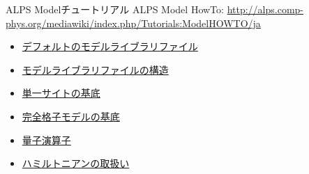 \begin{frame}{ALPS Modelチュートリアル}
  ALPS Model HowTo: {\footnotesize \url{http://alps.comp-phys.org/mediawiki/index.php/Tutorials:ModelHOWTO/ja}} \\
  \begin{itemize}
  \item \href{http://alps.comp-phys.org/mediawiki/index.php/Tutorials:ModelHOWTO/ja\#.E3.83.87.E3.83.95.E3.82.A9.E3.83.AB.E3.83.88.E3.81.AE.E3.83.A2.E3.83.87.E3.83.AB.E3.83.A9.E3.82.A4.E3.83.96.E3.83.A9.E3.83.AA.E3.83.95.E3.82.A1.E3.82.A4.E3.83.AB.E3.80.80}{デフォルトのモデルライブラリファイル}
  \item \href{http://alps.comp-phys.org/mediawiki/index.php/Tutorials:ModelHOWTO/ja\#.E3.83.A2.E3.83.87.E3.83.AB.E3.83.A9.E3.82.A4.E3.83.96.E3.83.A9.E3.83.AA.E3.83.95.E3.82.A1.E3.82.A4.E3.83.AB.E3.81.AE.E6.A7.8B.E9.80.A0}{モデルライブラリファイルの構造}
  \item \href{http://alps.comp-phys.org/mediawiki/index.php/Tutorials:ModelHOWTO/ja\#.E5.8D.98.E4.B8.80.E3.82.B5.E3.82.A4.E3.83.88.E3.81.AE.E5.9F.BA.E5.BA.95}{単一サイトの基底}
  \item \href{http://alps.comp-phys.org/mediawiki/index.php/Tutorials:ModelHOWTO/ja\#.E5.AE.8C.E5.85.A8.E6.A0.BC.E5.AD.90.E3.83.A2.E3.83.87.E3.83.AB.E3.81.AE.E5.9F.BA.E5.BA.95}{完全格子モデルの基底}
  \item \href{http://alps.comp-phys.org/mediawiki/index.php/Tutorials:ModelHOWTO/ja\#.E9.87.8F.E5.AD.90.E6.BC.94.E7.AE.97.E5.AD.90}{量子演算子}
  \item \href{http://alps.comp-phys.org/mediawiki/index.php/Tutorials:ModelHOWTO/ja\#.E3.83.8F.E3.83.9F.E3.83.AB.E3.83.88.E3.83.8B.E3.82.A2.E3.83.B3.E3.81.AE.E5.8F.96.E6.89.B1.E3.81.84}{ハミルトニアンの取扱い}
  \end{itemize}
\end{frame}



